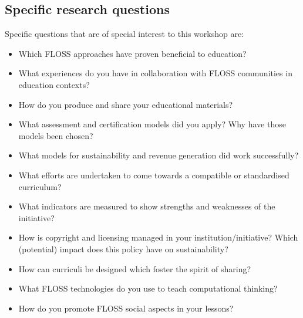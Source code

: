 \documentclass[a4paper,10pt]{article}
\begin{document}
\subsection*{Specific research questions}
Specific questions that are of special interest to this workshop are: 
\begin{itemize}
 \item Which FLOSS approaches have proven beneficial to education?
 \item What experiences do you have in collaboration with FLOSS communities in education contexts?
 \item How do you produce and share your educational materials? 
 \item What assessment and certification models did you apply? Why have those models been chosen? 
 \item What models for sustainability and revenue generation did work successfully? 
 \item What efforts are undertaken to come towards a compatible or standardised curriculum? 
 \item What indicators are measured to show strengths and weaknesses of the initiative? 
 \item How is copyright and licensing managed in your institution/initiative? Which (potential) impact does this policy have on sustainability? 
 \item How can curriculi be designed which foster the spirit of sharing? 
 \item What FLOSS technologies do you use to teach computational thinking?
 \item How do you promote FLOSS social aspects in your lessons?
\end{itemize}
\end{document}
